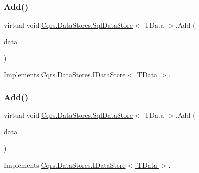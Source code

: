 \subsubsection{\texorpdfstring{Add()}{Add()}\hspace{0.1cm}{\footnotesize\ttfamily [1/2]}}
{\footnotesize\ttfamily virtual void \hyperlink{classCqrs_1_1DataStores_1_1SqlDataStore}{Cqrs.\+Data\+Stores.\+Sql\+Data\+Store}$<$ T\+Data $>$.Add (\begin{DoxyParamCaption}\item[{T\+Data}]{data }\end{DoxyParamCaption})\hspace{0.3cm}{\ttfamily [virtual]}}



Implements \hyperlink{interfaceCqrs_1_1DataStores_1_1IDataStore_a114404daaf37fec9cc5547cd9a17858c}{Cqrs.\+Data\+Stores.\+I\+Data\+Store$<$ T\+Data $>$}.

\mbox{\label{classCqrs_1_1DataStores_1_1SqlDataStore_a45aa105f2571510223c6073804690487}} 
\subsubsection{\texorpdfstring{Add()}{Add()}\hspace{0.1cm}{\footnotesize\ttfamily [2/2]}}
{\footnotesize\ttfamily virtual void \hyperlink{classCqrs_1_1DataStores_1_1SqlDataStore}{Cqrs.\+Data\+Stores.\+Sql\+Data\+Store}$<$ T\+Data $>$.Add (\begin{DoxyParamCaption}\item[{I\+Enumerable$<$ T\+Data $>$}]{data }\end{DoxyParamCaption})\hspace{0.3cm}{\ttfamily [virtual]}}



Implements \hyperlink{interfaceCqrs_1_1DataStores_1_1IDataStore_a906f3f2f80db7a549a4170eca4653e26}{Cqrs.\+Data\+Stores.\+I\+Data\+Store$<$ T\+Data $>$}.

\mbox{\label{classCqrs_1_1DataStores_1_1SqlDataStore_a8458af970314deef8eff6a4783b1c46f}} 
